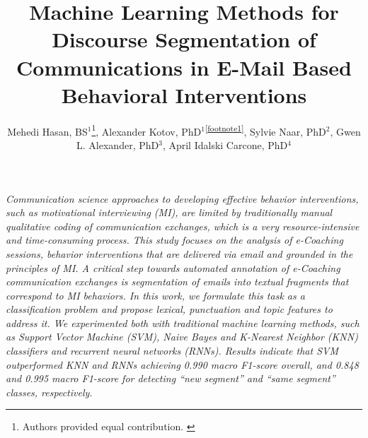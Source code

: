 \documentclass{amia}
\begin{document}
\title{Machine Learning Methods for Discourse Segmentation of Communications in E-Mail Based Behavioral Interventions}

\author{Mehedi Hasan, BS$^{1}$\footnote[1]{Authors provided equal contribution. \label{footnote1}}, Alexander Kotov, PhD$^{1}$\textsuperscript{\ref{footnote1}}, Sylvie Naar, PhD$^{2}$, Gwen L. Alexander, PhD$^{3}$, April Idalski Carcone, PhD$^{4}$}


\maketitle

\textit{Communication science approaches to developing effective behavior interventions, such as motivational interviewing (MI), are limited by traditionally manual qualitative coding of communication exchanges, which is a very resource-intensive and time-consuming process. This study focuses on the analysis of e-Coaching sessions, behavior interventions that are delivered via email and grounded in the principles of MI. A critical step towards automated annotation of e-Coaching communication exchanges is segmentation of emails into textual fragments that correspond to MI behaviors. In this work, we formulate this task as a classification problem and propose lexical, punctuation and topic features to address it. We experimented both with traditional machine learning methods, such as Support Vector Machine (SVM), Naive Bayes and K-Nearest Neighbor (KNN) classifiers and recurrent neural networks (RNNs). Results indicate that SVM outperformed KNN and RNNs achieving 0.990 macro F1-score overall, and 0.848 and 0.995 macro F1-score for detecting ``new segment'' and ``same segment'' classes, respectively.}
\end{document}
